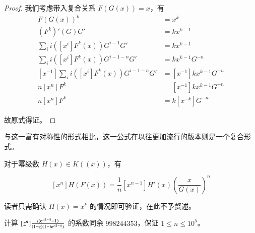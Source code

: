 \begin{proof}
我们考虑带入复合关系 $F(G(x))=x$，有
\begin{align*}
F(G(x))^k &= x^k\\
(F^k)'(G)G' &= kx^{k-1}\\
\sum_{i} i([x^i] F^k(x)) G^{i-1}G' &= kx^{k-1}\\
\sum_{i} i([x^i] F^k(x)) G^{i-1-n}G' &= kx^{k-1}G^{-n}\\ 
[x^{-1}]\sum_{i} i([x^i] F^k(x)) G^{i-1-n}G' &= [x^{-1}]kx^{k-1}G^{-n}\\ 
n[x^n] F^k &= [x^{-1}]kx^{k-1}G^{-n}\\ 
n[x^n] F^k &= k[x^{-k}]G^{-n}
\end{align*}

故原式得证。
\end{proof}

与这一富有对称性的形式相比，这一公式在以往更加流行的版本则是一个复合形式。

\begin{lemma}
对于幂级数 $H(x) \in K((x))$，有

$$
[x^n]H(F(x)) = \frac 1n [x^{n-1}] H'(x) \left(\frac x{G(x)}\right)^n
$$
\end{lemma}

读者只需确认 $H(x) = x^k$ 的情况即可验证，在此不予赘述。

\begin{problem}
计算 $[z^n]\frac{t(\mathrm{e}^{z(1-t)}-1)}{(1-z)(1-t\mathrm{e}^{z(1-t)})}$ 的系数同余 $998244353$，保证 $1\le n\le 10^5$。
\end{problem}

